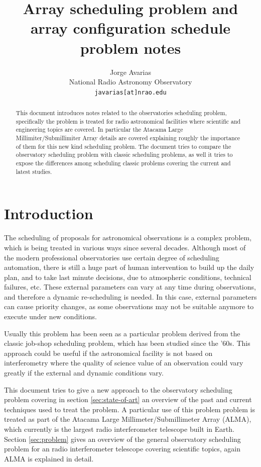 \documentclass[11pt]{article}
\begin{document}
\title{Array scheduling problem and array configuration schedule problem notes}
\author{Jorge Avarias \\
National Radio Astronomy Observatory\\
\texttt{javarias[at]nrao.edu}}
\maketitle

\begin{abstract}
This document introduces notes related to the observatories scheduling problem, specifically the problem is treated for radio astronomical facilities where scientific and engineering topics are covered. In particular the Atacama Large Millimiter/Submillimiter Array details are covered explaining roughly the importance of them for this new kind scheduling problem. The document tries to compare the observatory scheduling problem with classic scheduling problems, as well it tries to expose the differences among scheduling classic problems covering the current and latest studies. 
\end{abstract}

\section{Introduction}
The scheduling of proposals for astronomical observations is a complex problem, which is being treated in various ways since several decades. Although most of the modern professional observatories use certain degree of scheduling automation, there is still a huge part of human intervention to build up the daily plan, and to take last minute decisions, due to atmospheric conditions, technical failures, etc. These external parameters can vary at any time during observations, and therefore a dynamic re-scheduling is needed. In this case, external parameters can cause priority changes, as some observations may not be suitable anymore to execute under new conditions.

Usually this problem has been seen as a particular problem derived from the classic job-shop scheduling problem, which has been studied since the '60s. This approach could be useful if the astronomical facility is not based on interferometry where the quality of science value of an observation could vary greatly if the external and dynamic conditions vary. 

This document tries to give a new approach to the observatory scheduling problem covering in section \ref{sec:state-of-art} an overview of the past and current techniques used to treat the problem. A particular use of this problem problem is treated as part of the Atacama Large Millimeter/Submillimeter Array (ALMA), which currently is the largest radio interferometer telescope built in Earth. Section \ref{sec:problem} gives an overview of the general observatory scheduling problem for an radio interferometer telescope covering scientific topics, again ALMA is explained in detail.
\end{document}
